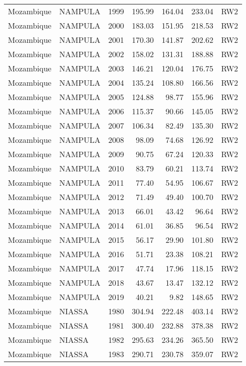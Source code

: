 \begin{longtable}{lllrrrl}
  Mozambique & NAMPULA & 1999 & 195.99 & 164.04 & 233.04 & RW2 \\ 
  Mozambique & NAMPULA & 2000 & 183.03 & 151.95 & 218.53 & RW2 \\ 
  Mozambique & NAMPULA & 2001 & 170.30 & 141.87 & 202.62 & RW2 \\ 
  Mozambique & NAMPULA & 2002 & 158.02 & 131.31 & 188.88 & RW2 \\ 
  Mozambique & NAMPULA & 2003 & 146.21 & 120.04 & 176.75 & RW2 \\ 
  Mozambique & NAMPULA & 2004 & 135.24 & 108.80 & 166.56 & RW2 \\ 
  Mozambique & NAMPULA & 2005 & 124.88 & 98.77 & 155.96 & RW2 \\ 
  Mozambique & NAMPULA & 2006 & 115.37 & 90.66 & 145.05 & RW2 \\ 
  Mozambique & NAMPULA & 2007 & 106.34 & 82.49 & 135.30 & RW2 \\ 
  Mozambique & NAMPULA & 2008 & 98.09 & 74.68 & 126.92 & RW2 \\ 
  Mozambique & NAMPULA & 2009 & 90.75 & 67.24 & 120.33 & RW2 \\ 
  Mozambique & NAMPULA & 2010 & 83.79 & 60.21 & 113.74 & RW2 \\ 
  Mozambique & NAMPULA & 2011 & 77.40 & 54.95 & 106.67 & RW2 \\ 
  Mozambique & NAMPULA & 2012 & 71.49 & 49.40 & 100.70 & RW2 \\ 
  Mozambique & NAMPULA & 2013 & 66.01 & 43.42 & 96.64 & RW2 \\ 
  Mozambique & NAMPULA & 2014 & 61.01 & 36.85 & 96.54 & RW2 \\ 
  Mozambique & NAMPULA & 2015 & 56.17 & 29.90 & 101.80 & RW2 \\ 
  Mozambique & NAMPULA & 2016 & 51.71 & 23.38 & 108.21 & RW2 \\ 
  Mozambique & NAMPULA & 2017 & 47.74 & 17.96 & 118.15 & RW2 \\ 
  Mozambique & NAMPULA & 2018 & 43.67 & 13.47 & 132.12 & RW2 \\ 
  Mozambique & NAMPULA & 2019 & 40.21 & 9.82 & 148.65 & RW2 \\ 
  Mozambique & NIASSA & 1980 & 304.94 & 222.48 & 403.14 & RW2 \\ 
  Mozambique & NIASSA & 1981 & 300.40 & 232.88 & 378.38 & RW2 \\ 
  Mozambique & NIASSA & 1982 & 295.63 & 234.26 & 365.50 & RW2 \\ 
  Mozambique & NIASSA & 1983 & 290.71 & 230.78 & 359.07 & RW2 \\ 

\end{longtable}

